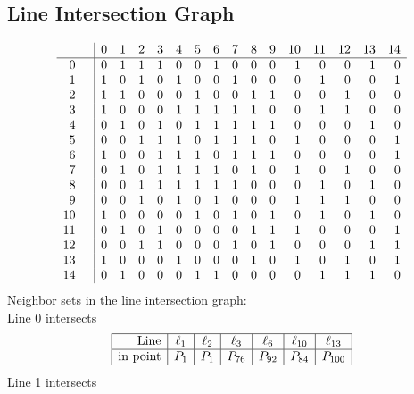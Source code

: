 \documentclass{article}
\begin{document}
{\subsection*{Line Intersection Graph}
{\arraycolsep=1pt
$$
\begin{array}{rr|*{15}r}
 &  & 0 & 1 & 2 & 3 & 4 & 5 & 6 & 7 & 8 & 9 & 10 & 11 & 12 & 13 & 14\\
\hline
0 &  & 0 & 1 & 1 & 1 & 0 & 0 & 1 & 0 & 0 & 0 & 1 & 0 & 0 & 1 & 0\\
1 &  & 1 & 0 & 1 & 0 & 1 & 0 & 0 & 1 & 0 & 0 & 0 & 1 & 0 & 0 & 1\\
2 &  & 1 & 1 & 0 & 0 & 0 & 1 & 0 & 0 & 1 & 1 & 0 & 0 & 1 & 0 & 0\\
3 &  & 1 & 0 & 0 & 0 & 1 & 1 & 1 & 1 & 1 & 0 & 0 & 1 & 1 & 0 & 0\\
4 &  & 0 & 1 & 0 & 1 & 0 & 1 & 1 & 1 & 1 & 1 & 0 & 0 & 0 & 1 & 0\\
5 &  & 0 & 0 & 1 & 1 & 1 & 0 & 1 & 1 & 1 & 0 & 1 & 0 & 0 & 0 & 1\\
6 &  & 1 & 0 & 0 & 1 & 1 & 1 & 0 & 1 & 1 & 1 & 0 & 0 & 0 & 0 & 1\\
7 &  & 0 & 1 & 0 & 1 & 1 & 1 & 1 & 0 & 1 & 0 & 1 & 0 & 1 & 0 & 0\\
8 &  & 0 & 0 & 1 & 1 & 1 & 1 & 1 & 1 & 0 & 0 & 0 & 1 & 0 & 1 & 0\\
9 &  & 0 & 0 & 1 & 0 & 1 & 0 & 1 & 0 & 0 & 0 & 1 & 1 & 1 & 0 & 0\\
10 &  & 1 & 0 & 0 & 0 & 0 & 1 & 0 & 1 & 0 & 1 & 0 & 1 & 0 & 1 & 0\\
11 &  & 0 & 1 & 0 & 1 & 0 & 0 & 0 & 0 & 1 & 1 & 1 & 0 & 0 & 0 & 1\\
12 &  & 0 & 0 & 1 & 1 & 0 & 0 & 0 & 1 & 0 & 1 & 0 & 0 & 0 & 1 & 1\\
13 &  & 1 & 0 & 0 & 0 & 1 & 0 & 0 & 0 & 1 & 0 & 1 & 0 & 1 & 0 & 1\\
14 &  & 0 & 1 & 0 & 0 & 0 & 1 & 1 & 0 & 0 & 0 & 0 & 1 & 1 & 1 & 0\\
\end{array}
$$
}%
Neighbor sets in the line intersection graph:\\
Line 0 intersects 
$$
\begin{array}{|r*{6}{|c}|}
\hline
\mbox{Line}  & \ell_{1} & \ell_{2} & \ell_{3} & \ell_{6} & \ell_{10} & \ell_{13}\\
\hline
\mbox{in point}  & P_{1} & P_{1} & P_{76} & P_{92} & P_{84} & P_{100}\\
\hline
\end{array}
$$
Line 1 intersects 
$$
\begin{array}{|r*{6}{|c}|}

\end{array}$$}
\end{document}
